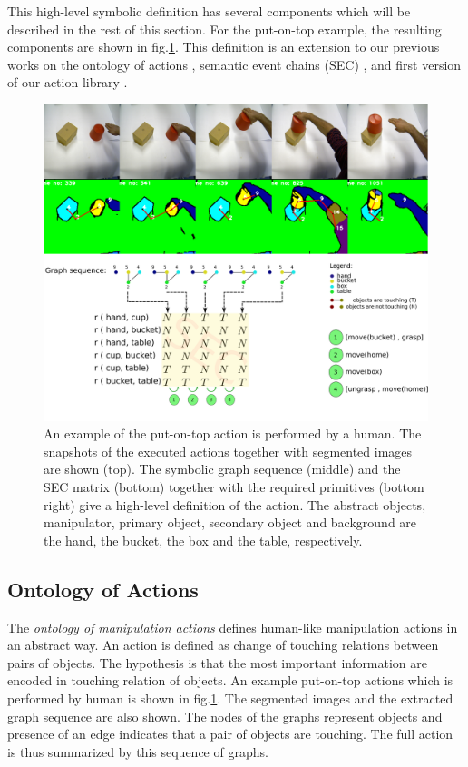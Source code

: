 This high-level symbolic definition has several components which will be described in the rest of this section.
For the put-on-top example, the resulting components are shown in fig.\ref{fig:action_graph_sec}.
This definition is an extension to our previous works on the ontology of actions \cite{TAMD13}, semantic event chains (SEC) \cite{Aksoy11b},
and first version of our action library \cite{aein2013toward}.
\begin{figure}
      \centering
      \includegraphics[scale=0.20]{./pdf/action_graph_sec.pdf}
      \caption{ An example of the put-on-top action is performed by a human. 
The snapshots of the executed actions together with segmented images are shown (top).
The symbolic graph sequence (middle) and the SEC matrix (bottom) together with 
the required primitives (bottom right) give a high-level definition of the action.
The abstract objects, manipulator, primary object, secondary object and background are the hand, the bucket, the box and the table, respectively.}
      \label{fig:action_graph_sec}
\end{figure}

\subsection{Ontology of Actions}
\label{sec:ontology}
The \textit{ontology of manipulation actions} \cite{TAMD13} defines human-like manipulation actions in an abstract way.
An action is defined as change of touching relations between pairs of objects.
The hypothesis is that the most important information are encoded in touching relation of objects.
An example put-on-top actions which is performed by human is shown in fig.\ref{fig:action_graph_sec}.
The segmented images and the extracted graph sequence are also shown.
The nodes of the graphs represent objects and presence of an edge indicates that a pair of objects are touching.
The full action is thus summarized by this sequence of graphs.

